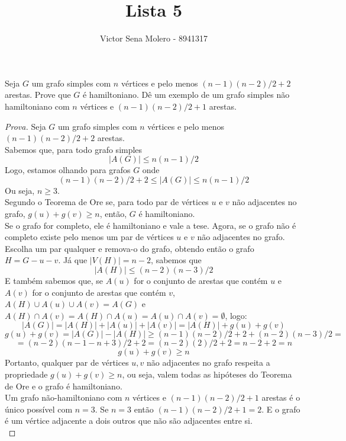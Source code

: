 \documentclass[12pt]{article}
\newenvironment{problem}[2][Ex]{\begin{trivlist}
\item[\hskip \labelsep {\bfseries #1}\hskip \labelsep {\bfseries #2.}]}{\end{trivlist}}
\begin{document}
 
 
\title{Lista 5}
\author{Victor Sena Molero - 8941317}
\maketitle

\begin{problem}{18}
Seja $G$ um grafo simples com $n$ vértices e pelo menos $(n-1)(n-2)/2 + 2$ arestas. Prove que $G$ é hamiltoniano. Dê um exemplo de um grafo simples não hamiltoniano com $n$ vértices e $(n-1)(n-2)/2 + 1$ arestas.
\end{problem}

\begin{proof}[Prova]
Seja $G$ um grafo simples com $n$ vértices e pelo menos $(n-1)(n-2)/2 + 2$ arestas. \\
Sabemos que, para todo grafo simples 
$$ |A(G)| \leq n(n-1)/2 $$ 
Logo, estamos olhando para grafos $G$ onde 
$$ (n-1)(n-2)/2 + 2 \leq |A(G)| \leq n(n-1)/2 $$ 
Ou seja, $n \geq 3$. \\
Segundo o Teorema de Ore se, para todo par de vértices $u$ e $v$ não adjacentes no grafo, $g(u) + g(v) \geq n$, então, $G$ é hamiltoniano. \\
Se o grafo for completo, ele é hamiltoniano e vale a tese. Agora, se o grafo não é completo existe pelo menos um par de vértices $u$ e $v$ não adjacentes no grafo. Escolha um par qualquer e remova-o do grafo, obtendo então o grafo $H = G - u - v$. Já que $|V(H)| = n-2$, sabemos que 
$$ |A(H)| \leq (n-2)(n-3)/2 $$ 
E também sabemos que, se $A(u)$ for o conjunto de arestas que contém $u$ e $A(v)$ for o conjunto de arestas que contém $v$, $A(H) \cup A(u) \cup A(v) = A(G)$ e $A(H) \cap A(v) = A(H) \cap A(u) = A(u) \cap A(v) = \emptyset$, logo: 
$$ |A(G)| = |A(H)| + |A(u)| + |A(v)| = |A(H)| + g(u) + g(v) $$ 
$$ g(u) + g(v) = |A(G)| - |A(H)| \geq (n-1)(n-2)/2 + 2 + (n-2)(n-3)/2 = $$
$$ = (n-2)(n-1-n+3)/2 + 2 = (n-2)(2)/2 + 2 = n-2+2 = n $$ 
$$ g(u) + g(v) \geq n $$ 
Portanto, qualquer par de vértices $u,v$ não adjacentes no grafo respeita a propriedade $g(u) + g(v) \geq n$, ou seja, valem todas as hipóteses do Teorema de Ore e o grafo é hamiltoniano. \\
Um grafo não-hamiltoniano com $n$ vértices e $(n-1)(n-2)/2 + 1$ arestas é o único possível com $n = 3$. Se $n = 3$ então $(n-1)(n-2)/2+1 = 2$. E o grafo é um vértice adjacente a dois outros que não são adjacentes entre si. \\
\end{proof}
\end{document}
